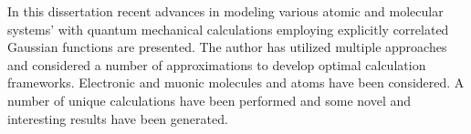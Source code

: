 In this dissertation recent advances in modeling various 
atomic and molecular systems' with quantum mechanical 
calculations employing 
explicitly correlated Gaussian functions are presented.
The author has utilized multiple approaches and considered
a number of approximations to develop optimal calculation
frameworks. Electronic and muonic molecules and atoms
have been considered.
A number of unique calculations have been performed and 
some novel and interesting results have been generated.
